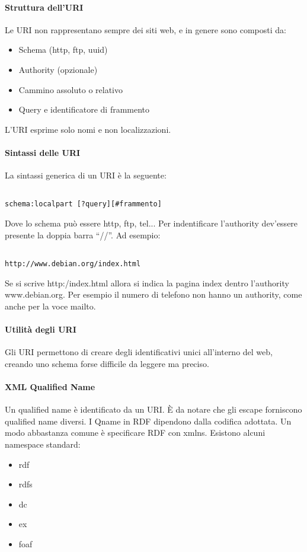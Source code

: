 \paragraph*{Struttura dell'URI}Le URI non rappresentano sempre dei siti web, e in genere sono composti da:
\begin{itemize}

\item Schema (http, ftp, uuid)
\item Authority (opzionale)
\item Cammino assoluto o relativo
\item Query e identificatore di frammento

\end{itemize}

L'URI esprime solo nomi e non localizzazioni.

\paragraph*{Sintassi delle URI}La sintassi generica di un URI \`e la seguente:
\begin{verbatim}

schema:localpart [?query][#frammento]

\end{verbatim}

Dove lo schema pu\`o essere http, ftp, tel...
Per indentificare l'authority dev'essere presente la doppia barra ``//''.
Ad esempio:
\begin{verbatim}

http://www.debian.org/index.html

\end{verbatim}

Se si scrive http:/index.html allora si indica la pagina index dentro l'authority www.debian.org.
Per esempio il numero di telefono non hanno un authority, come anche per la voce mailto.

\paragraph*{Utilit\`a degli URI}Gli URI permettono di creare degli identificativi unici all'interno del web, creando uno schema forse difficile da leggere ma preciso.

\paragraph*{XML Qualified Name}Un qualified name \`e identificato da un URI. \`E da notare che gli escape forniscono qualified name diversi. I Qname in RDF dipendono dalla codifica adottata. Un modo abbastanza comune \`e specificare RDF con xmlns.
Esistono alcuni namespace standard:
\begin{itemize}

\item rdf
\item rdfs
\item dc
\item ex
\item foaf

\end{itemize}


